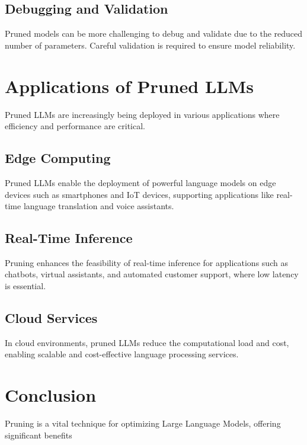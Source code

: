 \subsection{Debugging and Validation}
Pruned models can be more challenging to debug and validate due to the reduced number of parameters. Careful validation is required to ensure model reliability.

\section{Applications of Pruned LLMs}
Pruned LLMs are increasingly being deployed in various applications where efficiency and performance are critical.

\subsection{Edge Computing}
Pruned LLMs enable the deployment of powerful language models on edge devices such as smartphones and IoT devices, supporting applications like real-time language translation and voice assistants.

\subsection{Real-Time Inference}
Pruning enhances the feasibility of real-time inference for applications such as chatbots, virtual assistants, and automated customer support, where low latency is essential.

\subsection{Cloud Services}
In cloud environments, pruned LLMs reduce the computational load and cost, enabling scalable and cost-effective language processing services.

\section{Conclusion}
Pruning is a vital technique for optimizing Large Language Models, offering significant benefits
